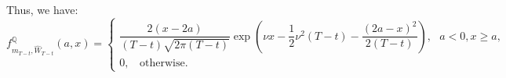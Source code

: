 \documentclass[12pt]{article}
\def\min{{\mbox{min}}}
\begin{document}
Thus, we have:
$$f^\mathbb{Q}_{m_{T-t},\widehat{W}_{T-t}}(a, x)= \begin{cases}
\dfrac{2(x-2a)}{(T-t)\sqrt{2\pi (T-t)}}\exp(\nu x-\dfrac12\nu^2(T-t)-\dfrac{(2a-x)^2}{2(T-t)}),~~~ a< 0, x\ge a,\\ 
0, ~~~~\text{otherwise}.
\end{cases}$$
\end{document}
